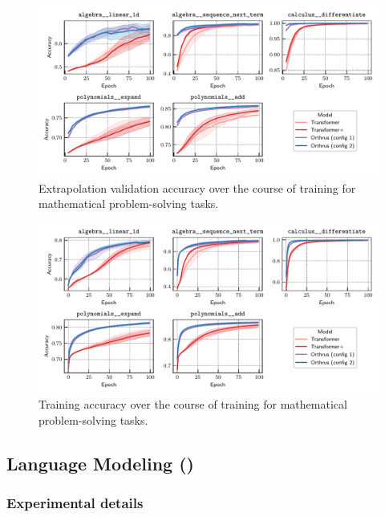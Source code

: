 \begin{figure}
    \centering
    \includegraphics[width=\textwidth]{figs/experiments/math/math_training_curves_extrapolation.pdf}
    \caption{Extrapolation validation accuracy over the course of training for mathematical problem-solving tasks.}\label{fig:math_training_curves_extrapolation}
\end{figure}

\begin{figure}
    \centering
    \includegraphics[width=\textwidth]{figs/experiments/math/math_training_curves_trainacc.pdf}
    \caption{Training accuracy over the course of training for mathematical problem-solving tasks.}\label{fig:math_training_curves_trainacc}
\end{figure}


\subsection{Language Modeling ()}\label{ssec:appendix_lm}

\subsubsection*{Experimental details}

